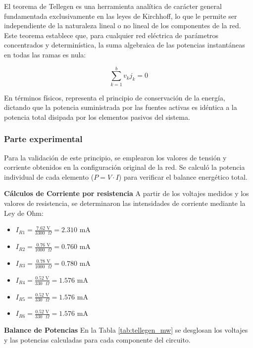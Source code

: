 El teorema de Tellegen es una herramienta analítica de carácter general fundamentada exclusivamente en las leyes de Kirchhoff, lo que le permite ser independiente de la naturaleza lineal o no lineal de los componentes de la red. Este teorema establece que, para cualquier red eléctrica de parámetros concentrados y determinística, la suma algebraica de las potencias instantáneas en todas las ramas es nula:

\begin{equation}
	\sum_{k=1}^{b} v_{k} j_{k} = 0
\end{equation}

En términos físicos, representa el principio de conservación de la energía, dictando que la potencia suministrada por las fuentes activas es idéntica a la potencia total disipada por los elementos pasivos del sistema.

\subsubsection{Parte experimental}

Para la validación de este principio, se emplearon los valores de tensión y corriente obtenidos en la configuración original de la red. Se calculó la potencia individual de cada elemento ($P = V \cdot I$) para verificar el balance energético total.

\textbf{Cálculos de Corriente por resistencia}
A partir de los voltajes medidos y los valores de resistencia, se determinaron las intensidades de corriente mediante la Ley de Ohm:

\begin{itemize}
	\item $I_{R1} = \frac{7.62 \text{ V}}{3300 \text{ } \Omega} = 2.310 \text{ mA}$
	\item $I_{R2} = \frac{0.76 \text{ V}}{1000 \text{ } \Omega} = 0.760 \text{ mA}$
	\item $I_{R3} = \frac{0.78 \text{ V}}{1000 \text{ } \Omega} = 0.780 \text{ mA}$
	\item $I_{R4} = \frac{0.52 \text{ V}}{330 \text{ } \Omega} = 1.576 \text{ mA}$
	\item $I_{R5} = \frac{0.52 \text{ V}}{330 \text{ } \Omega} = 1.576 \text{ mA}$
	\item $I_{R6} = \frac{0.52 \text{ V}}{330 \text{ } \Omega} = 1.576 \text{ mA}$
\end{itemize}

\textbf{Balance de Potencias}
En la Tabla \ref{tab:tellegen_mw} se desglosan los voltajes y las potencias calculadas para cada componente del circuito.

